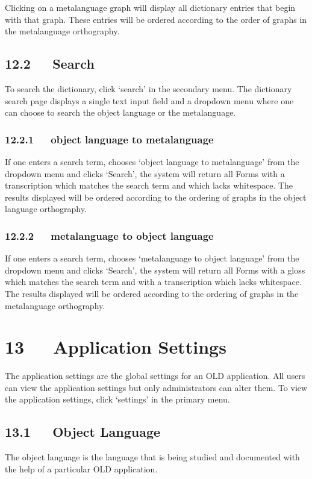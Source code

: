 \documentclass[letterpaper,10pt,english]{sphinxmanual}
\begin{document}
Clicking on a metalanguage graph will display all dictionary entries that
begin with that graph.  These entries will be ordered according to the order of
graphs in the metalanguage orthography.


\section{12.2   Search}
\label{user_guide:search}
To search the dictionary, click `search' in the secondary menu.  The dictionary
search page displays a single text input field and a dropdown menu where one can
choose to search the object language or the metalanguage.


\subsection{12.2.1   object language to metalanguage}
\label{user_guide:id23}
If one enters a search term, chooses `object language to metalanguage' from the
dropdown menu and clicks `Search', the system will return all Forms with a
transcription which matches the search term and which lacks whitespace.  The
results displayed will be ordered according to the ordering of graphs in the
object language orthography.


\subsection{12.2.2   metalanguage to object language}
\label{user_guide:id24}
If one enters a search term, chooses `metalanguage to object language' from the
dropdown menu and clicks `Search', the system will return all Forms with a
gloss which matches the search term and with a transcription which lacks
whitespace.  The results displayed will be ordered according to the ordering of
graphs in the metalanguage orthography.


\chapter{13   Application Settings}
\label{user_guide:application-settings}
The application settings are the global settings for an OLD application. All
users can view the application settings but only administrators can alter
them.  To view the application settings, click `settings' in the primary menu.


\section{13.1   Object Language}
\label{user_guide:object-language}
The object language is the language that is being studied and documented with
the help of a particular OLD application.
\end{document}
